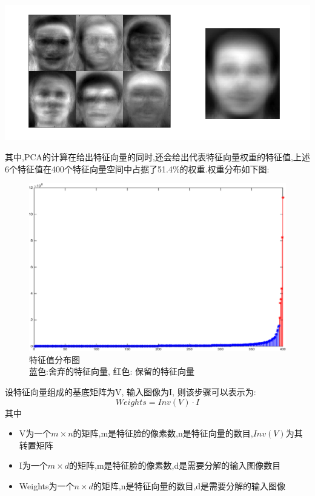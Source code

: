 \begin{center}
\begin{minipage}[t]{\linewidth}
\center
{
\includegraphics[width=\MyFactor\textwidth]{Img/pca_eigenspace.png} 
}
\end{minipage}
\medskip
\end{center}

其中,PCA的计算在给出特征向量的同时,还会给出代表特征向量权重的特征值,上述6个特征值在400个特征向量空间中占据了51.4\%的权重.权重分布如下图:

\begin{figure}[!htbp]
\centering \includegraphics[width=\textwidth]{Img/pca_eivalue.pdf} 
\caption{特征值分布图 \\ 蓝色:舍弃的特征向量, 红色: 保留的特征向量}
\end{figure}
设特征向量组成的基底矩阵为V, 输入图像为I, 则该步骤可以表示为:
\begin{equation}
Weights = Inv(V) \cdot I
\end{equation}
其中
\begin{itemize}
	\item V为一个$m  \times  n$的矩阵,m是特征脸的像素数,n是特征向量的数目,$Inv(V)$为其转置矩阵
	\item I为一个$m \times d$的矩阵,m是特征脸的像素数,d是需要分解的输入图像数目
	\item Weights为一个$n \times d$的矩阵,n是特征向量的数目,d是需要分解的输入图像
\end{itemize}


